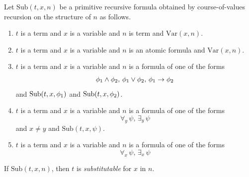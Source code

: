 \documentclass[10pt]{amsart}
\begin{document}
\begin{definition}
  Let $\mathrm{Sub}(t,x,n)$ be a primitive recursive formula obtained by course-of-values recursion on the structure of $n$ as follows.
  \begin{enumerate}[label=\textbf{(\arabic*)}, leftmargin=3.0em]
    \item $t$ is a term and $x$ is a variable and $n$ is term and $\mathrm{Var}(x,n)$.
    \item $t$ is a term and $x$ is a variable and $n$ is an atomic formula and $\mathrm{Var}(x,n)$.
    \item $t$ is a term and $x$ is a variable and $n$ is a formula of one of the forms
      $$\phi_{\rm{1}}\wedge \phi_{\rm{2}},\,\phi_{\rm{1}} \vee \phi_{\rm{2}},\,\phi_{\rm{1}}\rightarrow \phi_{\rm{2}}$$
      and $\mathrm{Sub}(t,x,\phi_{\rm{1}})$ and $\mathrm{Sub}(t,x,\phi_{\rm{2}})$.
    \item $t$ is a term and $x$ is a variable and $n$ is a formula of one of the forms
      $$\forall_y\,\psi,\,\exists_y\,\psi$$
      and $x \neq y$ and $\mathrm{Sub}(t,x,\psi)$.
    \item $t$ is a term and $x$ is a variable and $n$ is a formula of one of the forms
      $$\forall_x\,\psi,\,\exists_x\,\psi$$
  \end{enumerate}
If $\mathrm{Sub}(t,x,n)$, then $t$ is \textit{substitutable} for $x$ in $n$.
\end{definition}
\end{document}
